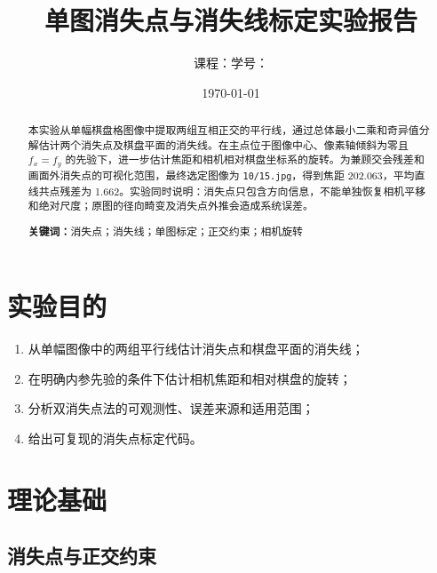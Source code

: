 \documentclass[UTF8,a4paper,12pt]{ctexart}
\title{单图消失点与消失线标定实验报告}
\author{课程：\CourseName\qquad \StudentName\quad 学号：\StudentID}
\date{\today}
\begin{document}
\maketitle
\thispagestyle{empty}

\begin{abstract}
本实验从单幅棋盘格图像中提取两组互相正交的平行线，通过总体最小二乘和奇异值分解估计两个消失点及棋盘平面的消失线。在主点位于图像中心、像素轴倾斜为零且 $f_x=f_y$ 的先验下，进一步估计焦距和相机相对棋盘坐标系的旋转。为兼顾交会残差和画面外消失点的可视化范围，最终选定图像为 \texttt{10/15.jpg}，得到焦距 \SI{202.063}{\pixel}，平均直线共点残差为 \SI{1.662}{\pixel}。实验同时说明：消失点只包含方向信息，不能单独恢复相机平移和绝对尺度；原图的径向畸变及消失点外推会造成系统误差。

\textbf{关键词：}消失点；消失线；单图标定；正交约束；相机旋转
\end{abstract}

\clearpage
\tableofcontents
\clearpage

\section{实验目的}

\begin{enumerate}
  \item 从单幅图像中的两组平行线估计消失点和棋盘平面的消失线；
  \item 在明确内参先验的条件下估计相机焦距和相对棋盘的旋转；
  \item 分析双消失点法的可观测性、误差来源和适用范围；
  \item 给出可复现的消失点标定代码。
\end{enumerate}

\section{理论基础}

\subsection{消失点与正交约束}
\end{document}
